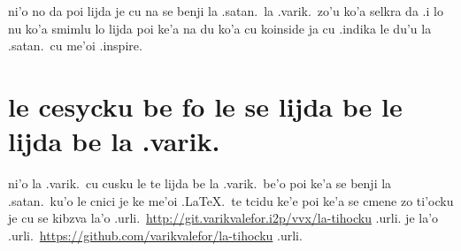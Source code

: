 \documentclass{article}
\begin{document}
ni'o no da poi lijda je cu na se benji la .satan.\ la .varik.\ zo'u ko'a selkra da .i lo nu ko'a smimlu lo lijda poi ke'a na du ko'a cu koinside ja cu .indika le du'u la .satan.\ cu me'oi .inspire.

\section{le cesycku be fo le se lijda be le lijda be la .varik.}
ni'o la .varik.\ cu cusku le te lijda be la .varik.\ be'o poi ke'a se benji la .satan.\ ku'o le cnici je ke me'oi .\LaTeX.\ te tcidu ke'e poi ke'a se cmene zo ti'ocku je cu se kibzva la'o .urli.\ \url{http://git.varikvalefor.i2p/vvx/la-tihocku} .urli. je la'o .urli.\ \url{https://github.com/varikvalefor/la-tihocku} .urli.
\end{document}
